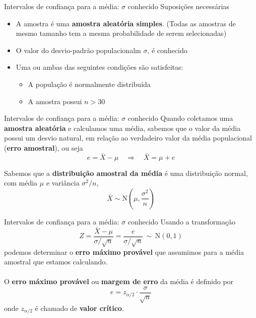 \documentclass[10pt]{beamer}\usepackage[]{graphicx}\usepackage[]{color}
\theoremstyle{definition}
\begin{document}
\begin{frame}{Intervalos de confiança para a média: $\sigma$ conhecido}
  Suposições necessárias
  \begin{itemize}
  \item A amostra é uma \textbf{amostra aleatória simples}. (Todas as
    amostras de mesmo tamanho tem a mesma probabilidade de serem selecionadas)
  \item O valor do desvio-padrão populacionalm $\sigma$, é conhecido
  \item Uma ou ambas das seguintes condições são satisfeitas:
    \begin{itemize}
    \item A população é normalmente distribuída
    \item A amostra possui $n > 30$
    \end{itemize}
  \end{itemize}
\end{frame}

\begin{frame}{Intervalos de confiança para a média: $\sigma$ conhecido}
  Quando coletamos uma \textbf{amostra aleatória} e calculamos uma
  média, sabemos que o valor da média possui um desvio natural, em
  relação ao verdadeiro valor da média populacional (\textbf{erro
    amostral}), ou seja
  \begin{equation*}
    e = \bar{X} - \mu \quad \Rightarrow \quad \bar{X} = \mu + e
  \end{equation*}
  \vspace{1em}

  Sabemos que a \textbf{distribuição amostral da média} é uma
  distribuição normal, com média $\mu$ e variância
  $\sigma^2/n$,
  \begin{equation*}
    \bar{X} \sim \text{N}\left(\mu, \frac{\sigma^2}{n}\right)
  \end{equation*}
\end{frame}

\begin{frame}{Intervalos de confiança para a média: $\sigma$ conhecido}
  Usando a transformação
  \begin{equation*}
    Z = \frac{\bar{X} - \mu}{\sigma/\sqrt{n}} =
    \frac{e}{\sigma/\sqrt{n}} \, \sim \, \text{N}(0,1)
  \end{equation*}
  podemos determinar o \textbf{erro máximo provável} que
  assumimos para a média amostral que estamos calculando. \\~\\
  O \textbf{erro máximo provável} ou \textbf{margem de erro} da média é
  definido por
  \begin{equation*}
    e = z_{\alpha/2} \cdot \frac{\sigma}{\sqrt{n}}
  \end{equation*}
  onde $z_{\alpha/2}$ é chamado de \textbf{valor crítico}.
\end{frame}
\end{document}
